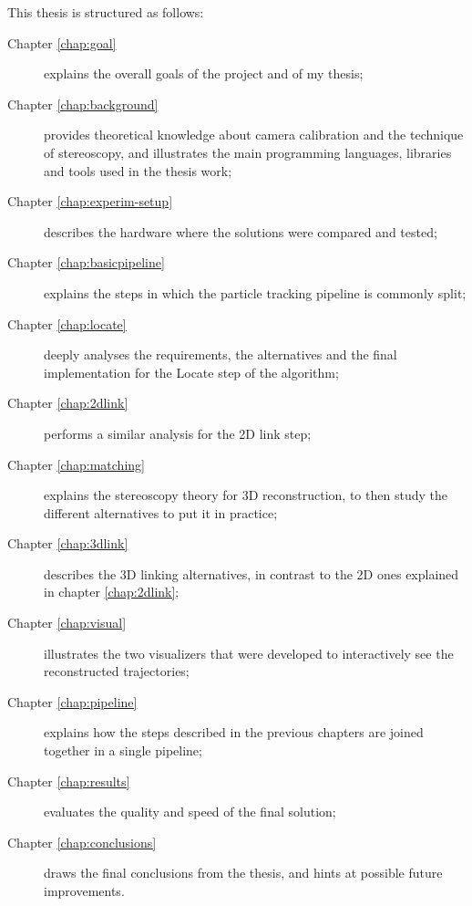 

\newcommand{\structuretype}{description}
\newcommand{\structureitem}[2]{\item[Chapter #1] #2}

This thesis is structured as follows:

\begin{\structuretype}
	\structureitem{\ref{chap:goal}}{explains the overall goals of the project and of my thesis;}
	\structureitem{\ref{chap:background}}{provides theoretical knowledge about camera calibration and the technique of stereoscopy, and illustrates the main programming languages, libraries and tools used in the thesis work;}
	\structureitem{\ref{chap:experim-setup}}{describes the hardware where the solutions were compared and tested;}
	\structureitem{\ref{chap:basicpipeline}}{explains the steps in which the particle tracking pipeline is commonly split;}
	\structureitem{\ref{chap:locate}}{deeply analyses the requirements, the alternatives and the final implementation for the Locate step of the algorithm;}
	\structureitem{\ref{chap:2dlink}}{performs a similar analysis for the 2D link step;}
	\structureitem{\ref{chap:matching}}{explains the stereoscopy theory for 3D reconstruction, to then study the different alternatives to put it in practice;}
	\structureitem{\ref{chap:3dlink}}{describes the 3D linking alternatives, in contrast to the 2D ones explained in chapter \ref{chap:2dlink};}
	\structureitem{\ref{chap:visual}}{illustrates the two visualizers that were developed to interactively see the reconstructed trajectories;}
	\structureitem{\ref{chap:pipeline}}{explains how the steps described in the previous chapters are joined together in a single pipeline;}
	\structureitem{\ref{chap:results}}{evaluates the quality and speed of the final solution;}
	\structureitem{\ref{chap:conclusions}}{draws the final conclusions from the thesis, and hints at possible future improvements.}
\end{\structuretype}
